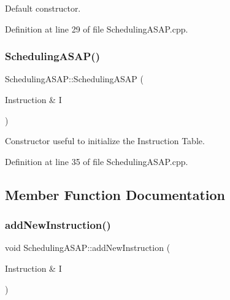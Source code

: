 Default constructor. 



Definition at line 29 of file Scheduling\+A\+S\+A\+P.\+cpp.

\mbox{\label{classoctantis_1_1SchedulingASAP_a8a6fee824cdf5a0a8cde0e98007ff991}} 
\subsubsection{\texorpdfstring{Scheduling\+A\+S\+A\+P()}{SchedulingASAP()}\hspace{0.1cm}{\footnotesize\ttfamily [2/2]}}
{\footnotesize\ttfamily Scheduling\+A\+S\+A\+P\+::\+Scheduling\+A\+S\+AP (\begin{DoxyParamCaption}\item[{Instruction \&}]{I }\end{DoxyParamCaption})}



Constructor useful to initialize the Instruction Table. 



Definition at line 35 of file Scheduling\+A\+S\+A\+P.\+cpp.



\subsection{Member Function Documentation}
\mbox{\label{classoctantis_1_1SchedulingASAP_ae901ec5f1113be04c9c28ab0f796c166}} 
\subsubsection{\texorpdfstring{add\+New\+Instruction()}{addNewInstruction()}}
{\footnotesize\ttfamily void Scheduling\+A\+S\+A\+P\+::add\+New\+Instruction (\begin{DoxyParamCaption}\item[{Instruction \&}]{I }\end{DoxyParamCaption})}



